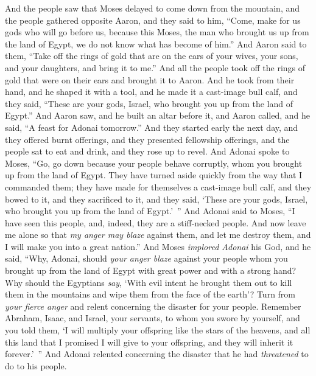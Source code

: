 \begin{biblechapter} %
 And the people saw that Moses delayed to come down from the mountain, and the people gathered opposite Aaron, and they said to him, “Come, make for us gods who will go before us, because this Moses, the man who brought us up from the land of Egypt, we do not know what has become of him.”
\verse And Aaron said to them, “Take off the rings of gold that are on the ears of your wives, your sons, and your daughters, and bring it to me.”
\verse And all the people took off the rings of gold that were on their ears and brought it to Aaron.
\verse And he took from their hand, and he shaped it with a tool, and he made it a cast-image bull calf, and they said, “These are your gods, Israel, who brought you up from the land of Egypt.”
\verse And Aaron saw, and he built an altar before it, and Aaron called, and he said, “A feast for Adonai tomorrow.”
\verse And they started early the next day, and they offered burnt offerings, and they presented fellowship offerings, and the people sat to eat and drink, and they rose up to revel.
\verse And Adonai spoke to Moses, “Go, go down because your people behave corruptly, whom you brought up from the land of Egypt.
\verse They have turned aside quickly from the way that I commanded them; they have made for themselves a cast-image bull calf, and they bowed to it, and they sacrificed to it, and they said, ‘These are your gods, Israel, who brought you up from the land of Egypt.’ ”
\verse And Adonai said to Moses, “I have seen this people, and, indeed, they are a stiff-necked people.
\verse And now leave me alone so that \textit{my anger may blaze} against them, and let me destroy them, and I will make you into a great nation.”
\verse And Moses \textit{implored Adonai} his God, and he said, “Why, Adonai, should \textit{your anger blaze} against your people whom you brought up from the land of Egypt with great power and with a strong hand?
\verse Why should the Egyptians \textit{say}, ‘With evil intent he brought them out to kill them in the mountains and wipe them from the face of the earth’? Turn from \textit{your fierce anger} and relent concerning the disaster for your people.
\verse Remember Abraham, Isaac, and Israel, your servants, to whom you swore by yourself, and you told them, ‘I will multiply your offspring like the stars of the heavens, and all this land that I promised I will give to your offspring, and they will inherit it forever.’ ”
\verse And Adonai relented concerning the disaster that he had \textit{threatened} to do to his people.

\end{biblechapter}
